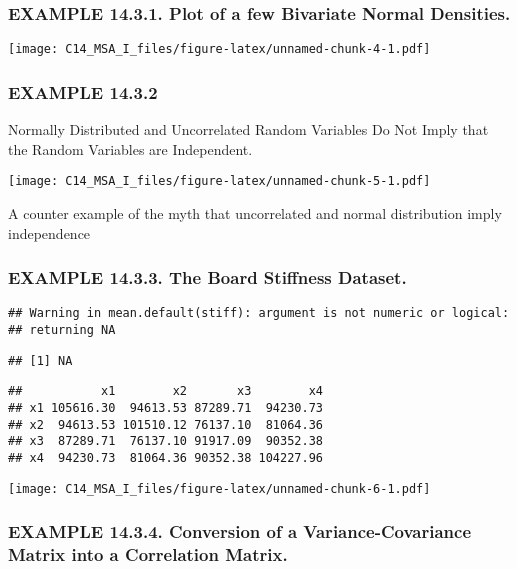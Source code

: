 \documentclass[]{article}
\begin{document}
\hypertarget{example-14.3.1.-plot-of-a-few-bivariate-normal-densities.}{%
\subsubsection{EXAMPLE 14.3.1. Plot of a few Bivariate Normal
Densities.}\label{example-14.3.1.-plot-of-a-few-bivariate-normal-densities.}}

\texttt{[image: C14\_MSA\_I\_files/figure-latex/unnamed-chunk-4-1.pdf]}

\hypertarget{example-14.3.2}{%
\subsubsection{EXAMPLE 14.3.2}\label{example-14.3.2}}

Normally Distributed and Uncorrelated Random Variables Do Not Imply that
the Random Variables are Independent.

\texttt{[image: C14\_MSA\_I\_files/figure-latex/unnamed-chunk-5-1.pdf]}

A counter example of the myth that uncorrelated and normal distribution
imply independence

\hypertarget{example-14.3.3.-the-board-stiffness-dataset.}{%
\subsubsection{EXAMPLE 14.3.3. The Board Stiffness
Dataset.}\label{example-14.3.3.-the-board-stiffness-dataset.}}

\begin{verbatim}
## Warning in mean.default(stiff): argument is not numeric or logical:
## returning NA
\end{verbatim}

\begin{verbatim}
## [1] NA
\end{verbatim}

\begin{verbatim}
##           x1        x2       x3        x4
## x1 105616.30  94613.53 87289.71  94230.73
## x2  94613.53 101510.12 76137.10  81064.36
## x3  87289.71  76137.10 91917.09  90352.38
## x4  94230.73  81064.36 90352.38 104227.96
\end{verbatim}

\texttt{[image: C14\_MSA\_I\_files/figure-latex/unnamed-chunk-6-1.pdf]}

\hypertarget{example-14.3.4.-conversion-of-a-variance-covariance-matrix-into-a-correlation-matrix.}{%
\subsubsection{EXAMPLE 14.3.4. Conversion of a Variance-Covariance
Matrix into a Correlation
Matrix.}\label{example-14.3.4.-conversion-of-a-variance-covariance-matrix-into-a-correlation-matrix.}}
\end{document}
